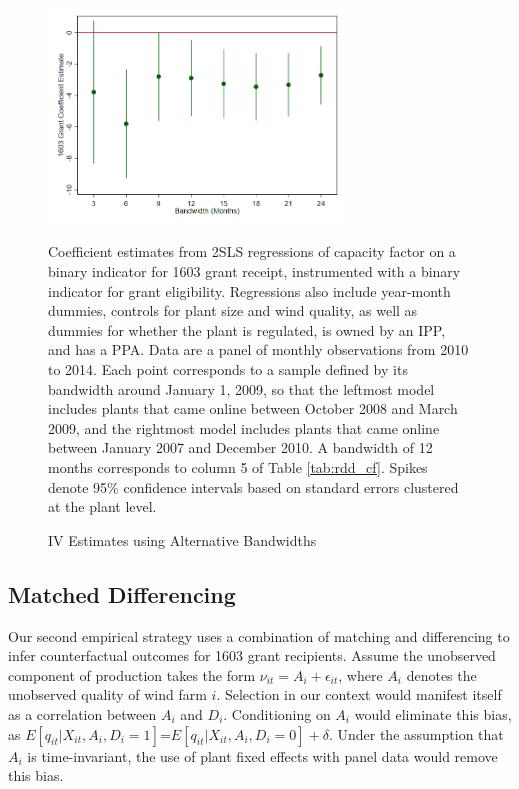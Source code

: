 \documentclass[12pt]{article}
\begin{document}
\begin{figure}[H]
\caption{IV Estimates using Alternative Bandwidths \label{fig:CFbandwidths}}
\vspace{-15pt}
\begin{center}
\includegraphics[width=0.7\textwidth]{fuzzyRDD_capfactor_bandwidths_nostateFEs.png}
\end{center}
\vspace{-15pt}
\footnotesize
Coefficient estimates from 2SLS regressions of capacity factor on a binary indicator for 1603 grant receipt, instrumented with a binary indicator for grant eligibility. Regressions also include year-month dummies, controls for plant size and wind quality, as well as dummies for whether the plant is regulated, is owned by an IPP, and has a PPA. Data are a panel of monthly observations from 2010 to 2014. Each point corresponds to a sample defined by its bandwidth around January 1, 2009, so that the leftmost model includes plants that came online between October 2008 and March 2009, and the rightmost model includes plants that came online between January 2007 and December 2010. A bandwidth of 12 months corresponds to column 5 of Table \ref{tab:rdd_cf}. Spikes denote 95\% confidence intervals based on standard errors clustered at the plant level.
\end{figure}


\subsection{Matched Differencing \label{subsec:Matching}}

Our second empirical strategy uses a combination of matching and differencing to infer counterfactual outcomes for 1603 grant recipients. Assume the unobserved component of production takes the form $\nu_{it}=A_{i}+\epsilon_{it}$, where $A_{i}$ denotes the unobserved quality of wind farm $i$. Selection in our context would manifest itself as a correlation between $A_{i}$ and $D_{i}$. Conditioning on $A_{i}$ would eliminate this bias, as $E[q_{it}|X_{it},A_{i},D_{i}=1]$=$E[q_{it}|X_{it},A_{i},D_{i}=0]+\delta$. Under the assumption that $A_{i}$ is time-invariant, the use of plant fixed effects with panel data would remove this bias.
\end{document}
